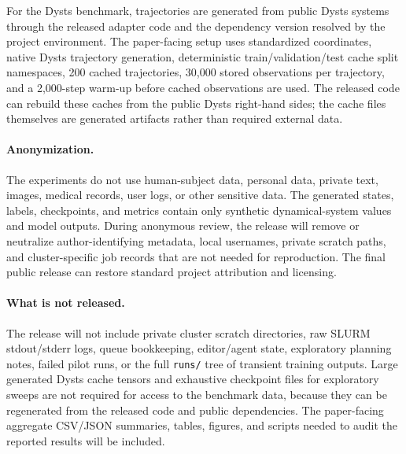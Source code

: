 For the Dysts benchmark, trajectories are generated from public Dysts systems
through the released adapter code and the dependency version resolved by the
project environment. The paper-facing setup uses standardized coordinates,
native Dysts trajectory generation, deterministic train/validation/test cache
split namespaces, 200 cached trajectories, 30,000 stored observations per
trajectory, and a 2,000-step warm-up before cached observations are used. The
released code can rebuild these caches from the public Dysts right-hand sides;
the cache files themselves are generated artifacts rather than required external
data.

\paragraph{Anonymization.}
The experiments do not use human-subject data, personal data, private text,
images, medical records, user logs, or other sensitive data. The generated
states, labels, checkpoints, and metrics contain only synthetic dynamical-system
values and model outputs. During anonymous review, the release will remove or
neutralize author-identifying metadata, local usernames, private scratch paths,
and cluster-specific job records that are not needed for reproduction. The final
public release can restore standard project attribution and licensing.

\paragraph{What is not released.}
The release will not include private cluster scratch directories, raw SLURM
stdout/stderr logs, queue bookkeeping, editor/agent state, exploratory planning
notes, failed pilot runs, or the full \texttt{runs/} tree of transient training
outputs. Large generated Dysts cache tensors and exhaustive checkpoint files for
exploratory sweeps are not required for access to the benchmark data, because
they can be regenerated from the released code and public dependencies. The
paper-facing aggregate CSV/JSON summaries, tables, figures, and scripts needed
to audit the reported results will be included.
